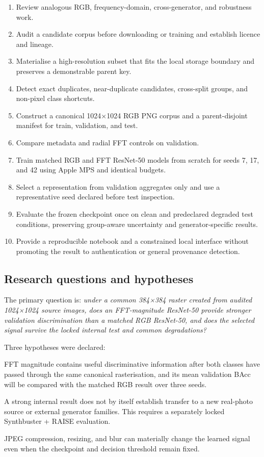\documentclass[12pt,a4paper]{article}
\begin{document}
\begin{enumerate}
  \item Review analogous RGB, frequency-domain, cross-generator, and robustness work.
  \item Audit a candidate corpus before downloading or training and establish licence and lineage.
  \item Materialise a high-resolution subset that fits the local storage boundary and preserves a
        demonstrable parent key.
  \item Detect exact duplicates, near-duplicate candidates, cross-split groups, and non-pixel class
        shortcuts.
  \item Construct a canonical 1024×1024 RGB PNG corpus and a parent-disjoint manifest for train,
        validation, and test.
  \item Compare metadata and radial FFT controls on validation.
  \item Train matched RGB and FFT ResNet-50 models from scratch for seeds 7, 17, and 42 using Apple
        MPS and identical budgets.
  \item Select a representation from validation aggregates only and use a representative seed
        declared before test inspection.
  \item Evaluate the frozen checkpoint once on clean and predeclared degraded test conditions,
        preserving group-aware uncertainty and generator-specific results.
  \item Provide a reproducible notebook and a constrained local interface without promoting the
        result to authentication or general provenance detection.
\end{enumerate}

\subsection{Research questions and hypotheses}

The primary question is: \emph{under a common 384×384 raster created from audited 1024×1024 source
images, does an FFT-magnitude ResNet-50 provide stronger validation discrimination than a matched
RGB ResNet-50, and does the selected signal survive the locked internal test and common
degradations?}

Three hypotheses were declared:

\begin{description}[style=nextline]
  \item[H1---representation.] FFT magnitude contains useful discriminative information after both
  classes have passed through the same canonical rasterisation, and its mean validation BAcc will
  be compared with the matched RGB result over three seeds.
  \item[H2---transfer.] A strong internal result does not by itself establish transfer to a new
  real-photo source or external generator families. This requires a separately locked
  Synthbuster + RAISE evaluation.
  \item[H3---robustness.] JPEG compression, resizing, and blur can materially change the learned
  signal even when the checkpoint and decision threshold remain fixed.
\end{description}
\end{document}

